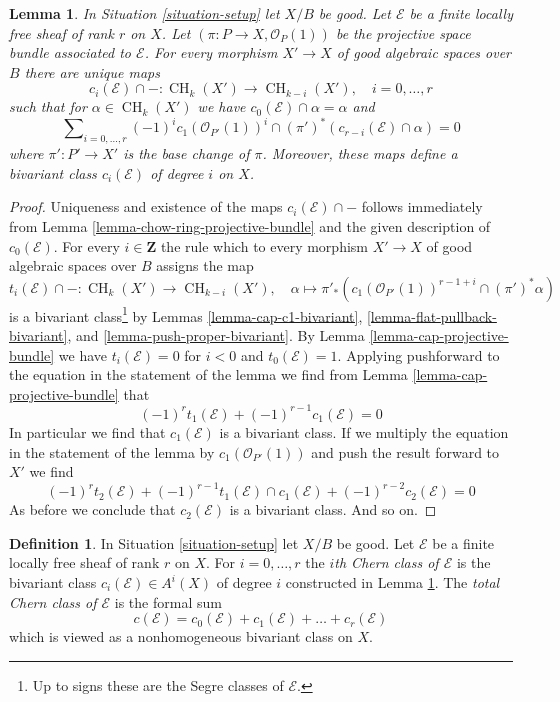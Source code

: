 \documentclass{stacks-project}
\theoremstyle{plain}
\newtheorem{lemma}[subsection]{Lemma}
\theoremstyle{definition}
\newtheorem{definition}[subsection]{Definition}
\theoremstyle{remark}
\numberwithin{equation}{subsection}
\def\CH{\mathop{\mathrm{CH}}\nolimits}
\begin{document}
\begin{lemma}
\label{lemma-segre-classes}
In Situation \ref{situation-setup} let $X/B$ be good.
Let $\mathcal{E}$ be a finite locally free sheaf of rank $r$ on $X$.
Let $(\pi : P \to X, \mathcal{O}_P(1))$ be the projective space
bundle associated to $\mathcal{E}$. For every
morphism $X' \to X$ of good algebraic spaces over $B$
there are unique maps
$$
c_i(\mathcal{E}) \cap - : \CH_k(X') \longrightarrow \CH_{k - i}(X'),\quad
i = 0, \ldots, r
$$
such that for $\alpha \in \CH_k(X')$ we have
$c_0(\mathcal{E}) \cap \alpha = \alpha$ and
$$
\sum\nolimits_{i = 0, \ldots, r}
(-1)^i c_1(\mathcal{O}_{P'}(1))^i \cap
(\pi')^*\left(c_{r - i}(\mathcal{E}) \cap \alpha\right) = 0
$$
where $\pi' : P' \to X'$ is the base change of $\pi$.
Moreover, these maps define a bivariant class
$c_i(\mathcal{E})$ of degree $i$ on $X$.
\end{lemma}

\begin{proof}
Uniqueness and existence of the maps $c_i(\mathcal{E}) \cap -$
follows immediately from Lemma \ref{lemma-chow-ring-projective-bundle}
and the given description of $c_0(\mathcal{E})$. For every $i \in \mathbf{Z}$
the rule which to every morphism $X' \to X$ of good algebraic spaces
over $B$ assigns the map
$$
t_i(\mathcal{E}) \cap - :
\CH_k(X') \longrightarrow \CH_{k - i}(X'),\quad
\alpha \longmapsto
\pi'_*(c_1(\mathcal{O}_{P'}(1))^{r - 1 + i} \cap (\pi')^*\alpha)
$$
is a bivariant class\footnote{Up to signs these are
the Segre classes of $\mathcal{E}$.} by Lemmas \ref{lemma-cap-c1-bivariant},
\ref{lemma-flat-pullback-bivariant}, and
\ref{lemma-push-proper-bivariant}.
By Lemma \ref{lemma-cap-projective-bundle} we have
$t_i(\mathcal{E}) = 0$ for $i < 0$ and $t_0(\mathcal{E}) = 1$.
Applying pushforward to the equation in the statement of the lemma
we find from Lemma \ref{lemma-cap-projective-bundle} that
$$
(-1)^r t_1(\mathcal{E}) + (-1)^{r - 1}c_1(\mathcal{E}) = 0
$$
In particular we find that $c_1(\mathcal{E})$ is a bivariant class.
If we multiply the equation in the statement of the lemma by
$c_1(\mathcal{O}_{P'}(1))$ and push the result forward to $X'$
we find
$$
(-1)^r t_2(\mathcal{E}) +
(-1)^{r - 1} t_1(\mathcal{E}) \cap c_1(\mathcal{E}) +
(-1)^{r - 2} c_2(\mathcal{E}) = 0
$$
As before we conclude that $c_2(\mathcal{E})$ is a bivariant class.
And so on.
\end{proof}

\begin{definition}
\label{definition-chern-classes}
In Situation \ref{situation-setup} let $X/B$ be good.
Let $\mathcal{E}$ be a finite locally free sheaf of rank $r$ on $X$.
For $i = 0, \ldots, r$ the {\it $i$th Chern class of $\mathcal{E}$}
is the bivariant class $c_i(\mathcal{E}) \in A^i(X)$ of degree $i$
constructed in Lemma \ref{lemma-segre-classes}.
The {\it total Chern class of $\mathcal{E}$}
is the formal sum
$$
c(\mathcal{E}) =
c_0(\mathcal{E}) + c_1(\mathcal{E}) + \ldots + c_r(\mathcal{E})
$$
which is viewed as a nonhomogeneous bivariant class on $X$.
\end{definition}
\end{document}

